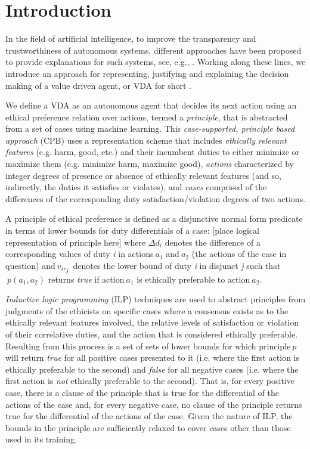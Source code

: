 \documentclass[letterpaper]{article} %
\begin{document}
\section{Introduction}
In the field of artificial intelligence,  to improve the transparency and trustworthiness of autonomous systems, different approaches have been proposed to provide explanations for such systems, see, e.g., \cite{Cocarascu2018,DBLP:conf/ijcai/ShihCD18,DBLP:journals/corr/abs-1806-08055}. Working along these lines, we introduce an approach for representing, justifying and explaining the decision making of a value driven agent, or VDA for short \cite{DBLP:conf/aaai/AndersonAB17}.  

We define a VDA as an autonomous agent that decides its next action using an ethical preference relation over actions, termed a \textit{principle}, that is abstracted from a set of cases using machine learning. This \textit{case-supported, principle based approach} (CPB) uses a representation scheme that includes \textit{ethically relevant features} (e.g. harm, good, etc.) and their incumbent duties to either minimize or maximize them (e.g. minimize harm, maximize good), \textit{actions} characterized by integer degrees of presence or absence of ethically relevant features (and so, indirectly, the duties it satisfies or violates), and \textit{cases} comprised of the differences of the corresponding duty satisfaction/violation degrees of two actions.  	

A principle of ethical preference is defined as a disjunctive normal form predicate in terms of lower bounds for duty differentials of a case: 
[place logical representation of principle here]
where $\Delta d_i$ denotes the difference of a corresponding values of duty \textit{i} in actions$\ a_1$ and$\ a_2$ (the actions of the case in question) and$\ v_i,_j$ denotes the lower bound of duty \textit{i} in disjunct \textit{j} such that$\ p(a_1,a_2)$ returns \textit{true} if action$\ a_1$  is ethically preferable to action$\ a_2$.  

\textit{Inductive logic programming} (ILP) techniques are used to abstract principles from judgments of the ethicists on specific cases where a consensus exists as to the ethically relevant features involved, the relative levels of satisfaction or violation of their correlative duties, and the action that is considered ethically preferable.  Resulting from this process is a set of sets of lower bounds for which principle$\ p$ will return \textit{true} for all positive cases presented to it (i.e. where the first action is ethically preferable to the second) and \textit{false} for all negative cases (i.e. where the first action is \textit{not} ethically preferable to the second). That is, for every positive case, there is a clause of the principle that is true for the differential of the actions of the case and, for every negative case, no clause of the principle returns true for the differential of the actions of the case.  Given the nature of ILP, the bounds in the principle are sufficiently relaxed to cover cases other than those used in its training.
\end{document}

